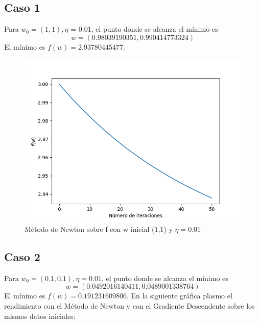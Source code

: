 \subsection{Caso 1}

Para $w_0=(1,1), \eta$ = 0.01, el punto donde se alcanza el mínimo es $$w=( 0.98039190351 , 0.990414773324 )$$ El mínimo es $f(w) = 2.93780445477$.

\begin{figure}[H] %
	\centering
	\includegraphics[scale=0.6]{bonus1.png}  %
	\caption{Método de Newton sobre f con w inicial (1,1) y $\eta = 0.01$} 
	\label{fig:bon1}
\end{figure}

\subsection{Caso 2}
Para $w_0=(0.1,0.1), \eta = 0.01$, el punto donde se alcanza el mínimo es $$w=(0.0492016140411 , 0.0489001338764)$$ El mínimo es $f(w) =0.191231609806$. En la siguiente gráfica plasmo el rendimiento con el Método de Newton y con el Gradiente Descendente sobre los mismos datos iniciales:

